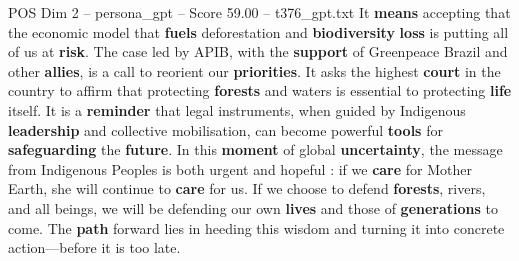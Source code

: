 \begin{textsample}{POS Dim 2 – persona\_gpt – Score 59.00 – t376\_gpt.txt}
It \textbf{means} accepting that the economic model that \textbf{fuels} deforestation and \textbf{biodiversity} \textbf{loss} is putting all of us at \textbf{risk}.
The case led by APIB, with the \textbf{support} of Greenpeace Brazil and other \textbf{allies}, is a call to reorient our \textbf{priorities}.
It asks the highest \textbf{court} in the country to affirm that protecting \textbf{forests} and waters is essential to protecting \textbf{life} itself.
It is a \textbf{reminder} that legal instruments, when guided by Indigenous \textbf{leadership} and collective mobilisation, can become powerful \textbf{tools} for \textbf{safeguarding} the \textbf{future}.
In this \textbf{moment} of global \textbf{uncertainty}, the message from Indigenous Peoples is both urgent and hopeful : if we \textbf{care} for Mother Earth, she will continue to \textbf{care} for us.
If we choose to defend \textbf{forests}, rivers, and all beings, we will be defending our own \textbf{lives} and those of \textbf{generations} to come.
The \textbf{path} forward lies in heeding this wisdom and turning it into concrete action—before it is too late.

\end{textsample}
